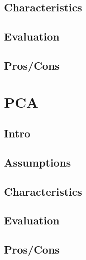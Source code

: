 \documentclass[]{book}
\theoremstyle{definition}
\theoremstyle{definition}
\theoremstyle{definition}
\theoremstyle{remark}
\begin{document}
\subsection{Characteristics}\label{characteristics-1}

\subsection{Evaluation}\label{evaluation-5}

\subsection{Pros/Cons}\label{proscons-6}

\section{PCA}\label{pca}

\subsection{Intro}\label{intro-7}

\subsection{Assumptions}\label{assumptions-7}

\subsection{Characteristics}\label{characteristics-2}

\subsection{Evaluation}\label{evaluation-6}

\subsection{Pros/Cons}\label{proscons-7}
\end{document}
